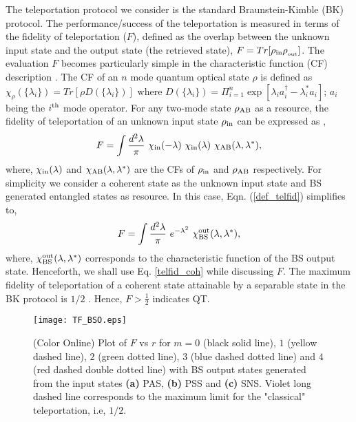 \documentclass[letter,scriptaddress,twocolumn, prl,showkeys]{revtex4}
\begin{document}
The teleportation protocol we consider is the standard Braunstein-Kimble (BK) \cite{TP_BK} protocol.
The performance/success of the teleportation is measured in terms of the fidelity of teleportation ($F$), defined as the overlap between the unknown input state and the output state (the retrieved state), $F=Tr[\rho_{\rm{in}}\rho_{\rm_{out}}]$. 
The evaluation $F$ becomes particularly simple in the characteristic function (CF) description \cite{TPF_CF}. 
The CF of an $n$ mode quantum optical state $\rho$ is defined as $\chi_{\rho}(\lbrace \lambda_{i} \rbrace)=Tr[\rho D(\lbrace \lambda_{i} \rbrace)]$ where $D(\lbrace \lambda_{i} \rbrace)=\Pi_{i=1}^{n}\exp [\lambda_{i} a^{\dagger}_{i}-\lambda^{*}_{i}a_{i}]$; $a_{i}$ being the $i^{\rm{th}}$ mode operator.
For any two-mode state $\rho_{\rm{AB}}$ as a resource, the fidelity of teleportation of an unknown input state $\rho_{\rm{in}}$ can be expressed as \cite{TPF_CF},
\begin{equation}
F=\int \frac{d^{2}\lambda}{\pi}~ \chi_{\rm{in}}(-\lambda)~\chi_{\rm{in}}(\lambda)~\chi_{\rm{AB}}(\lambda,\lambda^{*}),
\label{def_telfid}
\end{equation}
where, $\chi_{\rm{in}}(\lambda)$ and $\chi_{\rm{AB}}(\lambda,\lambda^{*})$ are the CFs of $\rho_{\rm{in}}$ and $\rho_{\rm{AB}}$ respectively. 
For simplicity we consider a coherent state as the unknown input state and BS generated entangled states as resource.
In this case, Eqn. (\ref{def_telfid}) simplifies to,
\begin{equation}
F=\int \frac{d^{2}\lambda}{\pi}~ e^{-\lambda^{2}}~\chi_{\rm{BS}}^{\rm{out}}(\lambda,\lambda^{*}) ,
\label{telfid_coh}
\end{equation}
where, $\chi_{\rm{BS}}^{\rm{out}}(\lambda,\lambda^{*})$ corresponds to the characteristic function of the BS output state.
Henceforth, we shall use Eq. \ref{telfid_coh} while discussing $F$. 
The maximum fidelity of teleportation of a coherent state attainable by a separable state in the BK protocol is $1/2$ \cite{TPF_CS}. 
Hence, $F> \frac{1}{2}$ indicates QT. 
\begin{figure}[h]
\texttt{[image: TF\_BSO.eps]}
\caption{(Color Online) Plot of $F$ vs $r$ for $m=0$ (black solid line), $1$ (yellow dashed line), $2$ (green dotted line), $3$ (blue dashed dotted line) and $4$ (red dashed double dotted line) with BS output states generated from the input states {\bf (a)} PAS, {\bf (b)} PSS and {\bf (c)} SNS. Violet long dashed line corresponds to the maximum limit for the "classical" teleportation, i.e, $1/2$. \label{fig_tf}}
\end{figure}
\end{document}
